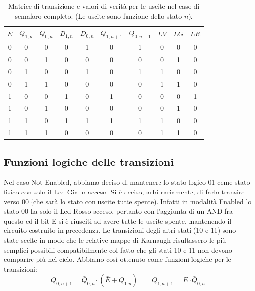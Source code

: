 \documentclass[10pt,a4paper]{article}
\begin{document}
\begin{table}
\centering
\begin{tabular}{|c||c|c|c|c||c|c||c|c|c|}
\hline
$E$ & $Q_{1,n}$ & $Q_{0, n}$ & $D_{1,n}$ & $D_{0,n}$ & $Q_{1, n+1}$ & $Q_{0, n+1}$ & $LV$ & $LG$ & $LR$\\
\hline
0 & 0 & 0 & 0 & 1 & 0 & 1 & 0 & 0 & 0 \\
0 & 0 & 1 & 0 & 0 & 0 & 0 & 0 & 1 & 0\\
0 & 1 & 0 & 0 & 1 & 0 & 1 & 1 & 0 & 0\\
0 & 1 & 1 & 0 & 0 & 0 & 0 & 1 & 1 & 0\\
\hline
1 & 0 & 0 & 1 & 0 & 1 & 0 & 0 & 0 & 1 \\
1 & 0 & 1 & 0 & 0 & 0 & 0 & 0 & 1 & 0\\
1 & 1 & 0 & 1 & 1 & 1 & 1 & 1 & 0 & 0\\
1 & 1 & 1 & 0 & 0 & 0 & 0 & 1 & 1 & 0\\
\hline
\end{tabular}
\caption{Matrice di transizione e valori di verità per le uscite nel caso di semaforo completo. (Le uscite sono funzione dello stato $n$). \label{tab:semaforocompleto}}
\end{table} 


\subsection{Funzioni logiche delle transizioni}
Nel caso Not Enabled, abbiamo deciso di mantenere lo stato logico 01 come stato fisico con solo il Led Giallo acceso. Si è deciso, arbitrariamente, di farlo transire verso 00 (che sarà lo stato con uscite tutte spente). Infatti in modalità Enabled lo stato 00 ha solo il Led Rosso acceso, pertanto con l'aggiunta di un AND fra questo ed il bit E si è riusciti ad avere tutte le uscite spente, mantenendo il circuito costruito in precedenza. Le transizioni degli altri stati (10 e 11) sono state scelte in modo che le relative mappe di Karnaugh risultassero le più semplici possibili compatibilmente col fatto che gli stati 10 e 11 non devono comparire più nel ciclo.
Abbiamo così ottenuto come funzioni logiche per le transizioni:
\begin{equation}
Q_{0, n+1} = \bar{Q}_{0,n}\cdot(\bar{E}+Q_{1,n})\qquad
Q_{1, n+1} = E\cdot \bar{Q}_{0, n}
\end{equation}
\end{document}
